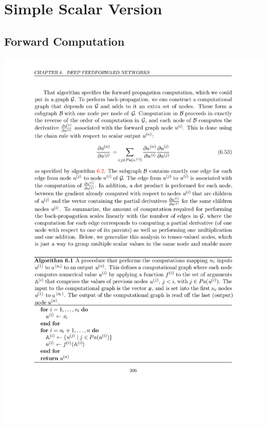 \documentclass[12pt, a4paper]{article}
\begin{document}
\section{Simple Scalar Version}

\subsection{Forward Computation}
\includegraphics[width=\textwidth]{../imgs/Forward_Computation.pdf}
\end{document}
